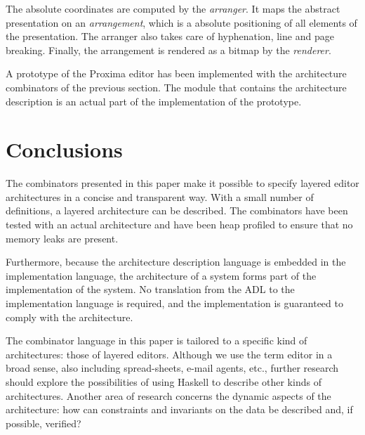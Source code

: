 The absolute coordinates are computed by the {\em arranger}. It maps the abstract presentation on an {\em arrangement}, which is a absolute positioning of all elements of the presentation. The arranger also takes care of hyphenation, line and page breaking. Finally, the arrangement is rendered as a bitmap by the {\em renderer}.

A prototype of the Proxima editor has been implemented with the architecture combinators of the previous section. The module that contains the architecture description is an actual part of the implementation of the prototype.

%																
%																
%																
\section{Conclusions} \label{secthaskellconclusions}

The combinators presented in this paper make it possible to specify layered editor architectures in a concise and transparent way. With a small number of definitions, a layered architecture can be described. The combinators have been tested with an actual architecture and have been heap profiled to ensure that no memory leaks are present.

Furthermore, because the architecture description language is embedded in the implementation language, the architecture of a system forms part of the implementation of the system. No translation from the ADL to the implementation language is required, and the implementation is guaranteed to comply with the architecture.

The combinator language in this paper is tailored to a specific kind of architectures: those of layered editors. Although we use the term editor in a broad sense, also including spread-sheets, e-mail agents, etc., further research should explore the possibilities of using Haskell to describe other kinds of architectures. Another area of research concerns the dynamic aspects of the architecture: how can constraints and invariants on the data be described and, if possible, verified?

